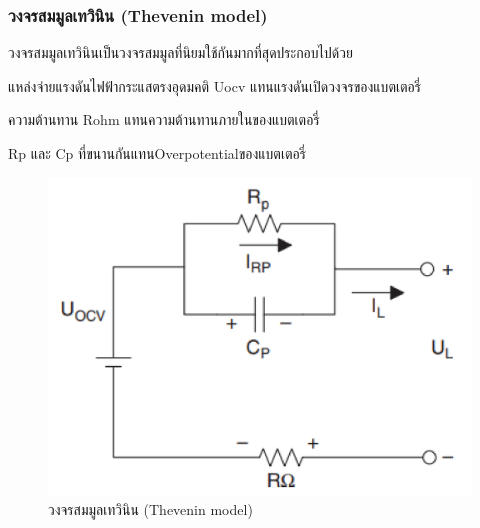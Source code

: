 \subsubsection*{วงจรสมมูลเทวินิน (Thevenin model)}
วงจรสมมูลเทวินินเป็นวงจรสมมูลที่นิยมใช้กันมากที่สุดประกอบไปด้วย
\begin{itemize}
{\item 	แหล่งจ่ายแรงดันไฟฟ้ากระแสตรงอุดมคติ Uocv แทนแรงดันเปิดวงจรของแบตเตอรี่}
{\item 	ความต้านทาน Rohm แทนความต้านทานภายในของแบตเตอรี่}
{\item 	Rp และ Cp ที่ขนานกันแทนOverpotentialของแบตเตอรี่}
\end{itemize}
\begin{center}
	\begin{figure}[H]
		\includegraphics[width=0.6\linewidth]{Chapters/img/Thevenin_model.png}
			\centering
			\captionsetup{justification=centering,margin=2cm}
			\caption{วงจรสมมูลเทวินิน (Thevenin model)}
	\end{figure}
\end{center}
